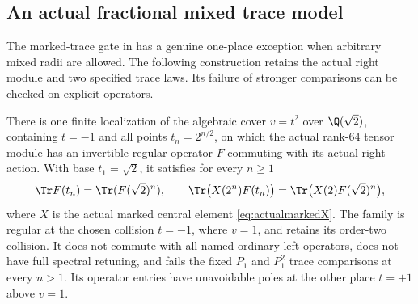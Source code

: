 \subsection{An actual fractional mixed trace model}
The marked-trace gate in  has a genuine
one-place exception when arbitrary mixed radii are allowed.
The following construction retains the actual right module
and two specified trace laws. Its failure of stronger
comparisons can be checked on explicit operators.

\begin{finding}
\label{f:fractionalescape}
There is one finite localization of the algebraic cover
$v=t^2$ over $\Q(\sqrt2)$, containing $t=-1$ and all points
$t_n=2^{n/2}$, on which the actual rank-$64$ tensor module
has an invertible regular operator $F$ commuting with its
actual right action. With base $t_1=\sqrt2$, it satisfies
for every $n\ge1$
\begin{equation}\label{eq:fractionaltwotraces}
 \Tr F(t_n)=\Tr(F(\sqrt2)^n),\qquad
 \Tr\bigl(X(2^n)F(t_n)\bigr)
       =\Tr\bigl(X(2)F(\sqrt2)^n\bigr),
\end{equation}
where $X$ is the actual marked central element
\eqref{eq:actualmarkedX}.
The family is regular at the chosen collision $t=-1$,
where $v=1$, and retains its order-two collision.
It does not commute with all named ordinary left
operators, does not have full spectral retuning, and
fails the fixed $P_1$ and $P_1^2$ trace comparisons at
every $n>1$. Its operator entries have unavoidable poles
at the other place $t=+1$ above $v=1$.
\end{finding}

